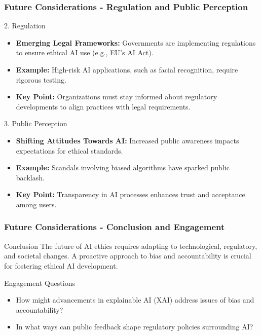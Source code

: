 \documentclass[aspectratio=169]{beamer}
\begin{document}
\begin{frame}[fragile]
    \frametitle{Future Considerations - Regulation and Public Perception}
    \begin{block}{2. Regulation}
        \begin{itemize}
            \item \textbf{Emerging Legal Frameworks:} Governments are implementing regulations to ensure ethical AI use (e.g., EU's AI Act).
            \item \textbf{Example:} High-risk AI applications, such as facial recognition, require rigorous testing.
            \item \textbf{Key Point:} Organizations must stay informed about regulatory developments to align practices with legal requirements.
        \end{itemize}
    \end{block}
    
    \begin{block}{3. Public Perception}
        \begin{itemize}
            \item \textbf{Shifting Attitudes Towards AI:} Increased public awareness impacts expectations for ethical standards.
            \item \textbf{Example:} Scandals involving biased algorithms have sparked public backlash.
            \item \textbf{Key Point:} Transparency in AI processes enhances trust and acceptance among users.
        \end{itemize}
    \end{block}
\end{frame}

\begin{frame}[fragile]
    \frametitle{Future Considerations - Conclusion and Engagement}
    \begin{block}{Conclusion}
        The future of AI ethics requires adapting to technological, regulatory, and societal changes. A proactive approach to bias and accountability is crucial for fostering ethical AI development.
    \end{block}
    
    \begin{block}{Engagement Questions}
        \begin{itemize}
            \item How might advancements in explainable AI (XAI) address issues of bias and accountability?
            \item In what ways can public feedback shape regulatory policies surrounding AI?
        \end{itemize}
    \end{block}
\end{frame}
\end{document}
